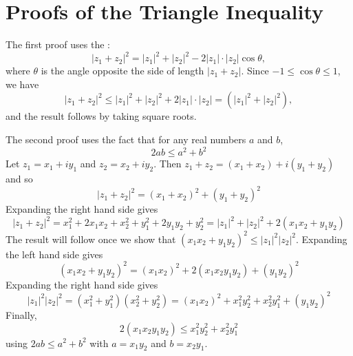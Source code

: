 \documentclass[handout]{ximera}
\begin{document}
\begin{image}
\end{image}



\section{Proofs of the Triangle Inequality}

The first proof uses the :
\[
|z_1 + z_2|^2 = |z_1|^2 + |z_2|^2 - 2|z_1|\cdot |z_2|\cos \theta,
\]
where $\theta$ is the angle opposite the side of length $|z_1 + z_2|$.
Since $-1 \leq \cos \theta \leq 1$, we have
\[
|z_1 + z_2|^2 \leq |z_1|^2 + |z_2|^2 + 2|z_1|\cdot |z_2| = \left(|z_1|^2 + |z_2|^2\right),
\]
and the result follows by taking square roots.

The second proof uses the fact that for any real numbers $a$ and $b$,
\[
2ab \leq a^2 + b^2
\]
Let $z_1 = x_1 + iy_1$ and $z_2 = x_2 + iy_2$. Then $z_1 + z_2 = (x_1 + x_2) + i(y_1 + y_2)$ and so
\[
|z_1 + z_2|^2 = (x_1 +x_2)^2 + (y_1 +y_2)^2
\]
Expanding the right hand side gives
\[
|z_1 + z_2|^2 = x_1^2 +2x_1x_2 +x_2^2 + y_1^2 + 2y_1y_2 +y_2^2 = |z_1|^2 + |z_2|^2 + 2(x_1x_2 + y_1y_2)
\]
The result will follow once we show that $(x_1x_2 + y_1y_2)^2 \leq |z_1|^2 |z_2|^2$.
Expanding the left hand side gives
\[
(x_1x_2 + y_1y_2)^2 = (x_1x_2)^2 + 2(x_1x_2y_1y_2) + (y_1y_2)^2
\]
Expanding the right hand side gives
\[
|z_1|^2 |z_2|^2 = (x_1^2+y_1^2)(x_2^2+y_2^2) = (x_1x_2)^2 + x_1^2y_2^2 + x_2^2y_1^2 + (y_1y_2)^2
\]
Finally,
\[
2(x_1x_2y_1y_2) \leq x_1^2y_2^2 + x_2^2y_1^2
\]
using $2ab \leq a^2 + b^2$ with $a = x_1y_2$ and $b=x_2y_1$.
\end{document}
